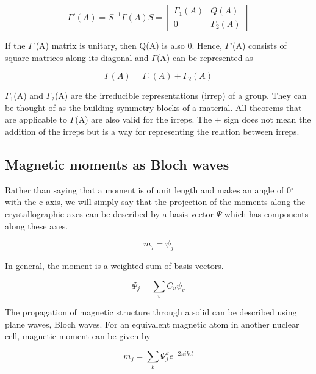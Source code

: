 \documentclass[10pt,doublespacing,edeposit]{uiucthesis2020}
\begin{document}
\begin{mainmatter}
\begin{equation}
\Gamma'(A) = S^{-1}\Gamma(A)S = \begin{bmatrix} \Gamma_1(A) & Q(A) \\ 0 & \Gamma_2(A) \end{bmatrix}
\end{equation}

If the $\Gamma$'(A) matrix is unitary, then Q(A) is also 0. Hence, $\Gamma$'(A) consists of square matrices along its diagonal and $\Gamma$(A) can be represented as –

\begin{equation}
\Gamma(A) = \Gamma_1(A) + \Gamma_2(A)
\end{equation}

$\Gamma_1$(A) and $\Gamma_2$(A) are the irreducible representations (irrep) of a group. They can be thought of as the building symmetry blocks of a material. All theorems that are applicable to $\Gamma$(A) are also valid for the irreps. The $+$ sign does not mean the addition of the irreps but is a way for representing the relation between irreps.

\subsection{Magnetic moments as Bloch waves}


Rather than saying that a moment is of unit length and makes an angle of 0$^\circ$ with the c-axis, we will simply say that the projection of the moments along the crystallographic axes can be described by a basis vector $\Psi$ which has components along these axes.

\begin{equation}
m_j = \psi_j
\end{equation}

In general, the moment is a weighted sum of basis vectors.

\begin{equation}
\Psi_j = \sum_v C_v \psi_v
\end{equation}

The propagation of magnetic structure through a solid can be described using plane waves, Bloch waves. For an equivalent magnetic atom in another nuclear cell, magnetic moment can be given by -

\begin{equation}
m_j = \sum_k \Psi_j^k e^{-2\pi ik.t}
\end{equation}


\end{mainmatter}
\end{document}
